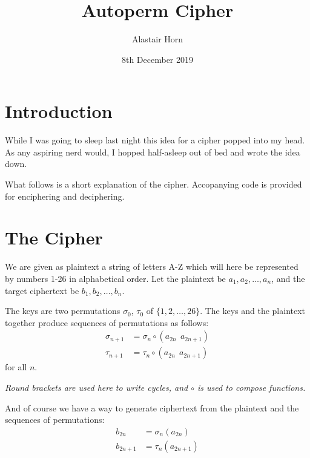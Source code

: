 \documentclass{article}
\title{Autoperm Cipher}
\date{8th December 2019}
\author{Alastair Horn}
\begin{document}
\maketitle

\section*{Introduction}

While I was going to sleep last night this idea for 
a cipher popped into my head. As any aspiring nerd
would, I hopped half-asleep out of bed and
wrote the idea down.

What follows is a short explanation of the cipher.
Accopanying code is provided for enciphering and deciphering.

\section*{The Cipher}

We are given as plaintext a string of letters A-Z
which will here be represented by numbers 1-26 in
alphabetical order. Let the plaintext be $a_1, a_2, \ldots, a_n$,
and the target ciphertext be $b_1, b_2, \ldots, b_n$.

The keys are two permutations $\sigma_0$, $\tau_0$ of
$\{1, 2, \ldots, 26\}$. The keys and the plaintext together produce
sequences of permutations as follows:
\begin{align*}
\sigma_{n+1} &= \sigma_n \circ (a_{2n} \ \ a_{2n+1}) \\
\tau_{n+1} &= \tau_n \circ (a_{2n} \ \ a_{2n+1})
\end{align*}
for all $n$.

\textit{Round brackets are used here to write cycles,
and $\circ$ is used to compose functions.}

And of course we have a way to generate ciphertext from the
plaintext and the sequences of permutations:
\begin{align*}
b_{2n} &= \sigma_n(a_{2n}) \\
b_{2n+1} &= \tau_n (a_{2n+1})
\end{align*}
\end{document}
